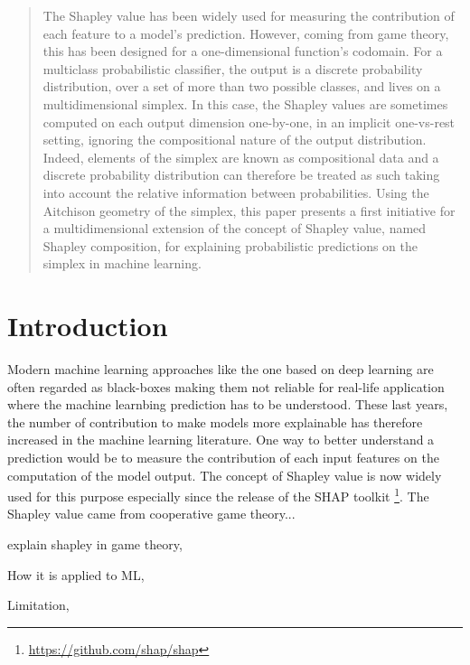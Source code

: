 \documentclass{article}
\theoremstyle{plain}
\theoremstyle{definition}
\theoremstyle{remark}
\begin{document}
\printAffiliationsAndNotice{\icmlEqualContribution} %

\begin{abstract}
  The Shapley value has been widely used for measuring the contribution of each feature to a model's prediction. However, coming from game theory, this has been designed for a one-dimensional function's codomain. For a multiclass probabilistic classifier, the output is a discrete probability distribution, over a set of more than two possible classes, and lives on a multidimensional simplex. In this case, the Shapley values are sometimes computed on each output dimension one-by-one, in an implicit one-vs-rest setting, ignoring the compositional nature of the output distribution. Indeed, elements of the simplex are known as compositional data and a discrete probability distribution can therefore be treated as such taking into account the relative information between probabilities. Using the Aitchison geometry of the simplex, this paper presents a first initiative for a multidimensional extension of the concept of Shapley value, named Shapley composition, for explaining probabilistic predictions on the simplex in machine learning.
\end{abstract}

\section{Introduction}

Modern machine learning approaches like the one based on deep learning are often regarded as black-boxes making them not reliable for real-life application where the machine learnbing prediction has to be understood. These last years, the number of contribution to make models more explainable has therefore increased in the machine learning literature. One way to better understand a prediction would be to measure the contribution of each input features on the computation of the model output. The concept of Shapley value is now widely used for this purpose \cite{vstrumbelj2014explaining,datta2016} especially since the release of the SHAP toolkit \cite{NIPS2017_7062}\footnote{\url{https://github.com/shap/shap}}. The Shapley value came from cooperative game theory...

explain shapley in game theory,

How it is applied to ML,

Limitation,
\end{document}
